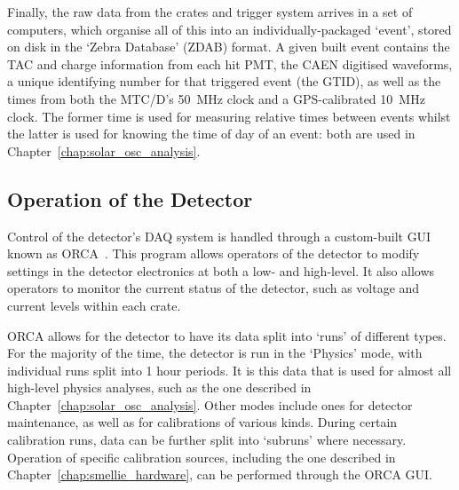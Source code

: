 Finally, the raw data from the crates and trigger system arrives in a set of computers, which organise all of this into an individually-packaged `event', stored on disk in the `Zebra Database' (ZDAB) format. A given built event contains the TAC and charge information from each hit PMT, the CAEN digitised waveforms, a unique identifying number for that triggered event (the GTID), as well as the times from both the MTC/D's \SI{50}{\MHz} clock and a GPS-calibrated \SI{10}{\MHz} clock. The former time is used for measuring relative times between events whilst the latter is used for knowing the time of day of an event: both are used in Chapter~\ref{chap:solar_osc_analysis}.


\subsection{Operation of the Detector}\label{sec:detector_ops}
Control of the detector's DAQ system is handled through a custom-built GUI known as ORCA~\cite{}. %
This program allows operators of the detector to modify settings in the detector electronics at both a low- and high-level. It also allows operators to monitor the current status of the detector, such as voltage and current levels within each crate.

ORCA allows for the detector to have its data split into `runs' of different types. For the majority of the time, the detector is run in the `Physics' mode, with individual runs split into 1 hour periods. It is this data that is used for almost all high-level physics analyses, such as the one described in Chapter~\ref{chap:solar_osc_analysis}. Other modes include ones for detector maintenance, as well as for calibrations of various kinds. During certain calibration runs, data can be further split into `subruns' where necessary. Operation of specific calibration sources, including the one described in Chapter~\ref{chap:smellie_hardware}, can be performed through the ORCA GUI.


